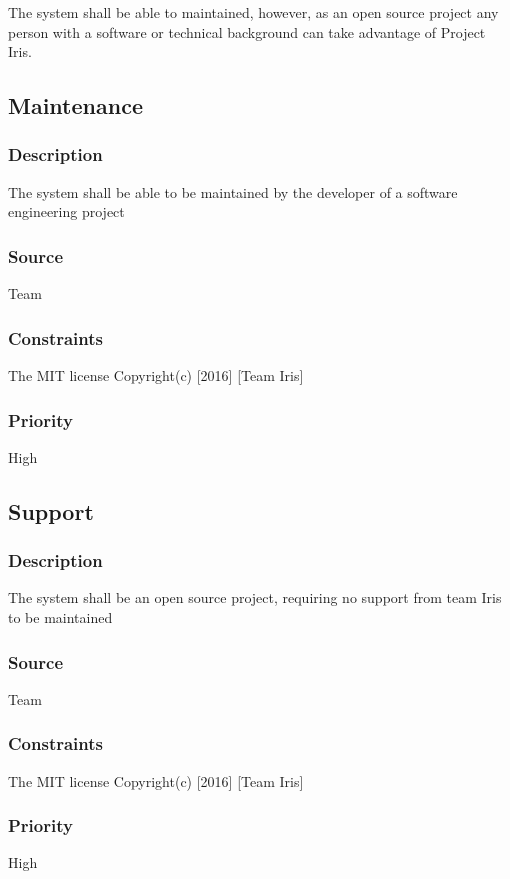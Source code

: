 The system shall be able to maintained, however, as an open source project any person with a software or technical background can take advantage of Project Iris. 

\subsection{Maintenance}
\subsubsection{Description}
The system shall be able to be maintained by the developer of a software engineering project
\subsubsection{Source}
Team
\subsubsection{Constraints}
The MIT license
Copyright(c) [2016] [Team Iris]
\subsubsection{Priority}
High
\subsection{Support}
\subsubsection{Description}
The system shall be an open source project, requiring no support from team Iris to be maintained
\subsubsection{Source}
Team
\subsubsection{Constraints}
The MIT license
Copyright(c) [2016] [Team Iris]
\subsubsection{Priority}
High